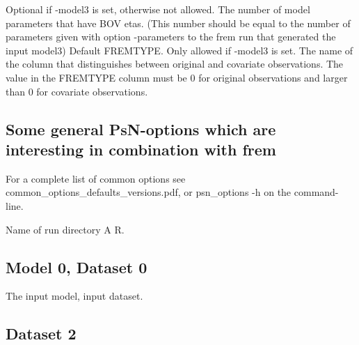 \begin{optionlist}
\nextopt
{}
Optional if -model3 is set, otherwise not allowed. The number of model parameters that have BOV etas. (This number should be equal to the number of parameters given with option -parameters to the frem run that generated the input model3)  
\nextopt
{}
Default FREMTYPE. Only allowed if -model3 is set. The name of the column that distinguishes between original and covariate observations. The value in the FREMTYPE column must be 0 for original observations and larger than 0 for covariate observations.  
\nextopt
\end{optionlist}


\subsection{Some general PsN-options which are interesting in combination with frem}
For a complete list of common options see common\_options\_defaults\_versions.pdf, or psn\_options -h on the command-line.

\begin{optionlist}
Name of run directory 
\nextopt
{}
A 
\nextopt
{}
R. 
\nextopt
\end{optionlist}


\subsection{Model 0, Dataset 0}
The input model, input dataset.

\subsection{Dataset 2}


